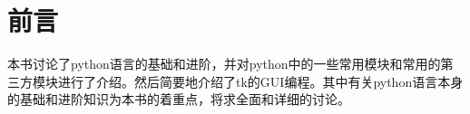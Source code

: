 \documentclass[12pt,oneside]{book}
\begin{document}
\frontmatter

\author{万泽}
\titleLB

\chapter*{前言}
\begin{common-format}
本书讨论了python语言的基础和进阶，并对python中的一些常用模块和常用的第三方模块进行了介绍。然后简要地介绍了tk的GUI编程。其中有关python语言本身的基础和进阶知识为本书的着重点，将求全面和详细的讨论。



\end{common-format}


\setcounter{tocdepth}{2}
\tableofcontents
\end{document}
